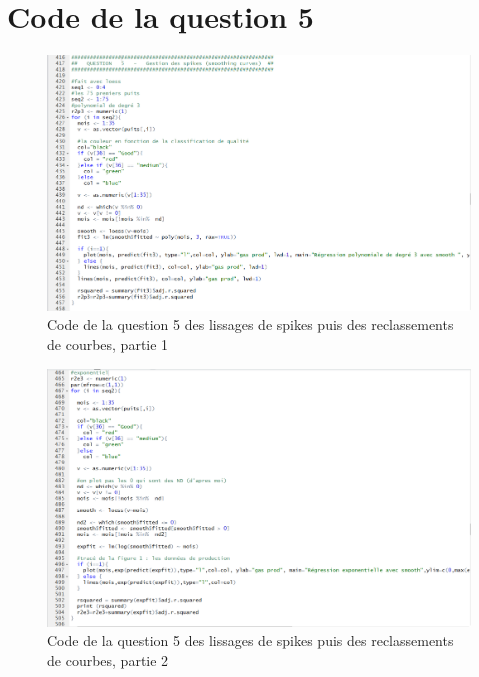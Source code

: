 \documentclass[12pt]{article}
\begin{document}
\section{Code de la question 5}
\begin{figure}[H]
 \centering %
	\includegraphics[width=600px]{code_q5_1}
  \caption{\label{fig:code_q5_1} Code de la question 5 des lissages de spikes puis des reclassements de courbes, partie 1}
\end{figure}
\begin{figure}[H]
 \centering %
	\includegraphics[width=600px]{code_q5_2}
  \caption{\label{fig:code_q5_2} Code de la question 5 des lissages de spikes puis des reclassements de courbes, partie 2}
\end{figure}
\end{document}
